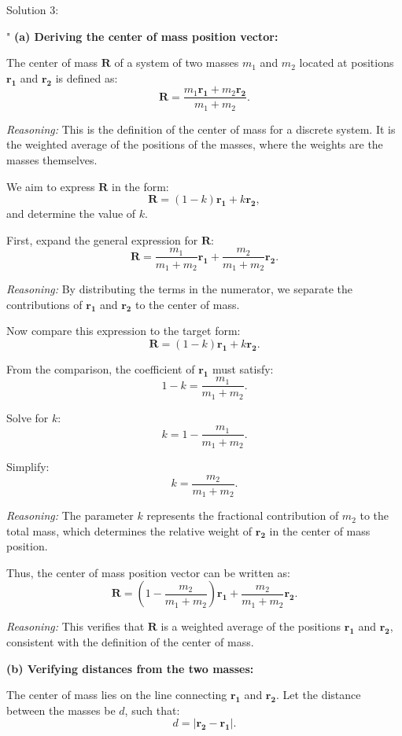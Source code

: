 Solution 3:

"
\textbf{(a) Deriving the center of mass position vector:}

The center of mass $\mathbf{R}$ of a system of two masses $m_1$ and $m_2$ located at positions $\mathbf{r_1}$ and $\mathbf{r_2}$ is defined as:
\[
\mathbf{R} = \frac{m_1 \mathbf{r_1} + m_2 \mathbf{r_2}}{m_1 + m_2}.
\]

\textit{Reasoning:} This is the definition of the center of mass for a discrete system. It is the weighted average of the positions of the masses, where the weights are the masses themselves.

We aim to express $\mathbf{R}$ in the form:
\[
\mathbf{R} = (1 - k)\mathbf{r_1} + k\mathbf{r_2},
\]
and determine the value of $k$.

First, expand the general expression for $\mathbf{R}$:
\[
\mathbf{R} = \frac{m_1}{m_1 + m_2} \mathbf{r_1} + \frac{m_2}{m_1 + m_2} \mathbf{r_2}.
\]

\textit{Reasoning:} By distributing the terms in the numerator, we separate the contributions of $\mathbf{r_1}$ and $\mathbf{r_2}$ to the center of mass.

Now compare this expression to the target form:
\[
\mathbf{R} = (1 - k)\mathbf{r_1} + k\mathbf{r_2}.
\]

From the comparison, the coefficient of $\mathbf{r_1}$ must satisfy:
\[
1 - k = \frac{m_1}{m_1 + m_2}.
\]

Solve for $k$:
\[
k = 1 - \frac{m_1}{m_1 + m_2}.
\]

Simplify:
\[
k = \frac{m_2}{m_1 + m_2}.
\]

\textit{Reasoning:} The parameter $k$ represents the fractional contribution of $m_2$ to the total mass, which determines the relative weight of $\mathbf{r_2}$ in the center of mass position.

Thus, the center of mass position vector can be written as:
\[
\mathbf{R} = (1 - \frac{m_2}{m_1 + m_2})\mathbf{r_1} + \frac{m_2}{m_1 + m_2}\mathbf{r_2}.
\]

\textit{Reasoning:} This verifies that $\mathbf{R}$ is a weighted average of the positions $\mathbf{r_1}$ and $\mathbf{r_2}$, consistent with the definition of the center of mass.

\bigskip

\textbf{(b) Verifying distances from the two masses:}

The center of mass lies on the line connecting $\mathbf{r_1}$ and $\mathbf{r_2}$. Let the distance between the masses be $d$, such that:
\[
d = |\mathbf{r_2} - \mathbf{r_1}|.
\]

